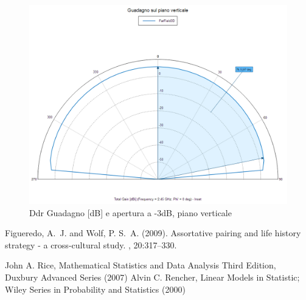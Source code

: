 \documentclass[twoside,twocolumn]{article}
\begin{document}
\begin{figure}[h!]
  \includegraphics[width=\linewidth]{A_verticale.png}
  \caption{Ddr Guadagno [dB] e apertura a -3dB, piano verticale}
  \label{fig:A_verticale}
\end{figure}






\begin{thebibliography}{99} %

Figueredo, A.~J. and Wolf, P. S.~A. (2009).
\newblock Assortative pairing and life history strategy - a cross-cultural
  study.
, 20:317--330.

John A. Rice, Mathematical Statistics and Data Analysis Third Edition, Duxbury Advanced Series (2007)
Alvin C. Rencher, Linear Models in Statistic; Wiley Series in Probability and Statistics (2000)

\end{thebibliography}

\end{document}
